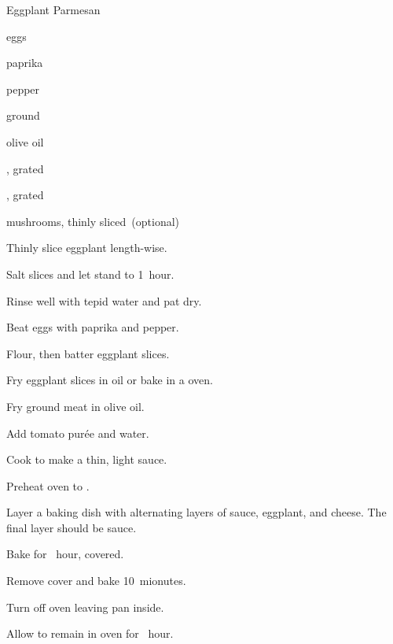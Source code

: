 \begin{recipe}{Eggplant Parmesan}{}{}

\begin{ingredients}
\item {}
\item eggs
\item paprika
\item pepper
\item ground 
\item olive oil
\item {}
\item {}, grated
\item {}, grated
\item mushrooms, thinly sliced~(optional)
\end{ingredients}

\begin{directions}
\item Thinly slice eggplant length-wise.
\item Salt slices and let stand \half{} to 1~hour.
\item Rinse well with tepid water and pat dry.
\item Beat eggs with paprika and pepper.
\item Flour, then batter eggplant slices.
\item Fry eggplant slices in oil or bake in a  oven.
\item Fry ground meat in olive oil.
\item Add tomato purée and water.
\item Cook to make a thin, light sauce.
\item Preheat oven to .
\item Layer a baking dish with alternating layers of sauce, eggplant, and cheese. The final layer should be sauce.
\item Bake for \half~hour, covered.
\item Remove cover and bake 10~mionutes.
\item Turn off oven leaving pan inside.
\item Allow to remain in oven for \half~hour.
\end{directions}

\end{recipe}
